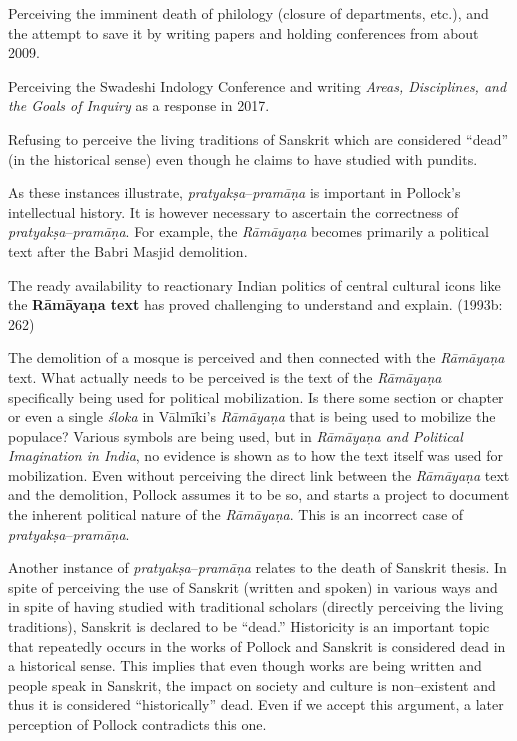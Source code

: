  \item Perceiving the imminent death of philology (closure of departments, etc.), and the attempt to save it by writing papers and holding conferences from about 2009.

 \item Perceiving the Swadeshi Indology Conference and writing \textit{Areas, Disciplines, and the Goals of Inquiry} as a response in 2017.

 \item Refusing to perceive the living traditions of Sanskrit which are considered “dead” (in the historical sense) even though he claims to have studied with pundits.

As these instances illustrate, \textit{pratyakṣa}–\textit{pramāṇa} is important in Pollock’s intellectual history. It is however necessary to ascertain the correctness of \textit{pratyakṣa}–\textit{pramāṇa}. For example, the \textit{Rāmāyaṇa} becomes primarily a political text after the Babri Masjid demolition.

\begin{myquote}
The ready availability to reactionary Indian politics of central cultural icons like the \textbf{Rāmāyaṇa text} has proved challenging to understand and explain. (1993b: 262)
\end{myquote}

The demolition of a mosque is perceived and then connected with the \textit{Rāmāyaṇa} text. What actually needs to be perceived is the text of the \textit{Rāmāyaṇa }specifically being used for political mobilization. Is there some section or chapter or even a single \textit{śloka} in Vālmīki’s \textit{Rāmāyaṇa} that is being used to mobilize the populace? Various symbols are being used, but in \textit{Rāmāyaṇa and Political Imagination in India}, no evidence is shown as to how the text itself was used for mobilization. Even without perceiving the direct link between the \textit{Rāmāyaṇa }text and the demolition, Pollock assumes it to be so, and starts a project to document the inherent political nature of the \textit{Rāmāyaṇa}. This is an incorrect case of \textit{pratyakṣa}–\textit{pramāṇa}.

Another instance of \textit{pratyakṣa}–\textit{pramāṇa }relates to the death of Sanskrit thesis. In spite of perceiving the use of Sanskrit (written and spoken) in various ways and in spite of having studied with traditional scholars (directly perceiving the living traditions), Sanskrit is declared to be “dead.” Historicity is an important topic that repeatedly occurs in the works of Pollock and Sanskrit is considered dead in a historical sense. This implies that even though works are being written and people speak in Sanskrit, the impact on society and culture is non–existent and thus it is considered “historically” dead. Even if we accept this argument, a later perception of Pollock contradicts this one.

